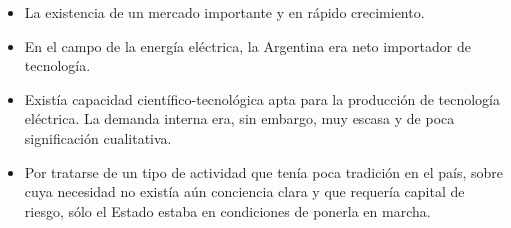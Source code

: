 \begin{itemize}
    \item La existencia de un mercado importante y en rápido crecimiento.
    \item En el campo de la energía eléctrica, la Argentina era neto importador de tecnología.
    \item Existía capacidad científico-tecnológica apta para la producción de tecnología eléctrica. La demanda interna era, sin embargo, muy escasa y de poca significación cualitativa.
    \item Por tratarse de un tipo de actividad que tenía poca tradición en el país, sobre cuya necesidad no existía aún conciencia clara y que requería capital de riesgo, sólo el Estado estaba en condiciones de ponerla en marcha.
\end{itemize}

